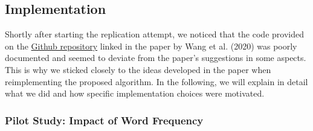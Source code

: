 \documentclass[
  english,
  man,floatsintext]{apa6}
\begin{document}
\hypertarget{implementation}{%
\subsection{Implementation}\label{implementation}}

Shortly after starting the replication attempt, we noticed that the code provided on the \href{https://github.com/uvavision/Double-Hard-Debias}{Github repository} linked in the paper by Wang et al. (2020) was poorly documented and seemed to deviate from the paper's suggestions in some aspects. This is why we sticked closely to the ideas developed in the paper when reimplementing the proposed algorithm. In the following, we will explain in detail what we did and how specific implementation choices were motivated.

\hypertarget{pilot-study-impact-of-word-frequency}{%
\subsubsection{Pilot Study: Impact of Word Frequency}\label{pilot-study-impact-of-word-frequency}}
\end{document}
